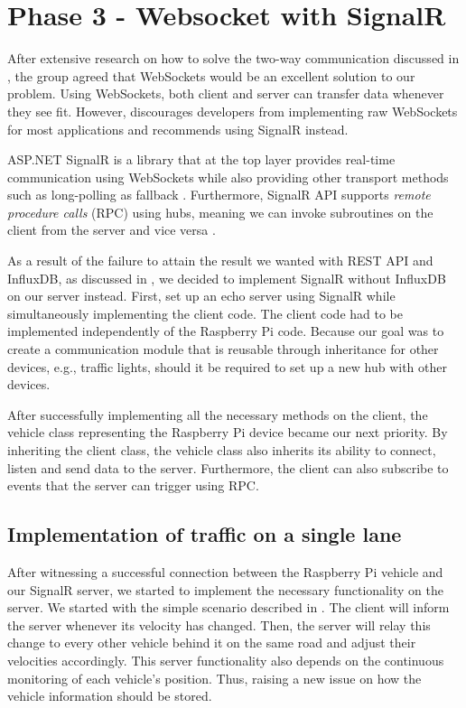 \section{Phase 3 - Websocket with SignalR}\label{phase3}
After extensive research on how to solve the two-way communication discussed in , the group agreed that WebSockets would be an excellent solution to our problem. Using WebSockets, both client and server can transfer data whenever they see fit. However, \cite{microsoft_websockets} discourages developers from implementing raw WebSockets for most applications and recommends using SignalR instead.

ASP.NET SignalR is a library that at the top layer provides real-time communication using WebSockets while also providing other transport methods such as long-polling as fallback \parencite{microsoft_signalr}. Furthermore, SignalR API supports \emph{remote procedure calls} (RPC) using hubs, meaning we can invoke subroutines on the client from the server and vice versa \parencite{microsoft_signalr}.

As a result of the failure to attain the result we wanted with REST API and InfluxDB, as discussed in , we decided to implement SignalR without InfluxDB on our server instead. First, set up an echo server using SignalR while simultaneously implementing the client code. The client code had to be implemented independently of the Raspberry Pi code. Because our goal was to create a communication module that is reusable through inheritance for other devices, e.g., traffic lights, should it be required to set up a new hub with other devices.

After successfully implementing all the necessary methods on the client, the vehicle class representing the Raspberry Pi device became our next priority. By inheriting the client class, the vehicle class also inherits its ability to connect, listen and send data to the server. Furthermore, the client can also subscribe to events that the server can trigger using RPC.

\subsection{Implementation of traffic on a single lane}
After witnessing a successful connection between the Raspberry Pi vehicle and our SignalR server, we started to implement the necessary functionality on the server. We started with the simple scenario described in . The client will inform the server whenever its velocity has changed. Then, the server will relay this change to every other vehicle behind it on the same road and adjust their velocities accordingly. This server functionality also depends on the continuous monitoring of each vehicle's position. Thus, raising a new issue on how the vehicle information should be stored.

